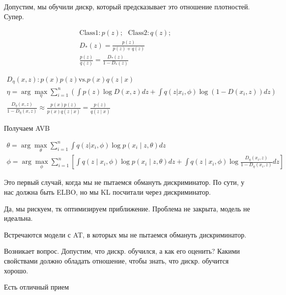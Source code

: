 \documentclass{book}
\begin{document}
Допустим, мы обучили дискр, который предсказывает это отношение плотностей. Супер.

\begin{gather*}
  \mathrm{Class 1}: p(z);~~~ \mathrm{Class 2}: q(z);~~~\\
  D_*(z)=\frac{p(z)}{p(z)+q(z)}\\
  \frac{p(z)}{q(z)}=\frac{D_*(z)}{1-D_*(z)}
\end{gather*}

\begin{gather*}
  D_\eta(x, z): p(x)p(z) \mathrm{vs.} p(x)q(z\mid x)\\
  \eta = \arg\max_\eta \sum_{i=1}^{n} {\left(\int {p(z)\log D(x,z)dz}+\int {q(z|x_i,\phi)\log(1-D(x_i,z))dz}\right)}\\
  \frac{D_\eta(x,z)}{1-D_\eta(x,z)}\approx \frac{p(x)p(z)}{p(x)q(z\mid x)}=\frac{p(z)}{q(z\mid x)}
\end{gather*}

Получаем AVB

\begin{gather*}
  \theta=\arg\max_\theta \sum_{i=1}^{n} {\int {q(z|x_i,\phi)\log p(x_i \mid z, \theta)dz}}\\
  \phi=\arg\max_\phi \sum_{i=1}^{n} {\left[\int {q(z\mid x_i,\phi)\log p(x_i\mid z, \theta)dz}+\int {q(z\mid x_i, \phi)\log \frac{D_\eta(x_i, z)}{1-D_\eta(x_i, z)}dz}\right]}
\end{gather*}

Это первый случай, когда мы не пытаемся обмануть дискриминатор. По сути, у нас должна быть ELBO, но мы KL посчитали через дискриминатор.

Да, мы рискуем, тк оптимизируем приближение. Проблема не закрыта, модель не идеальна.

Встречаются модели с AT, в которых мы не пытаемся обмануть дискриминатор.

Возникает вопрос. Допустим, что дискр. обучился, а как его оценить? Какими свойствами должно обладать отношение, чтобы знать, что дискр. обучится хорошо.

Есть отличный прием

\end{document}
